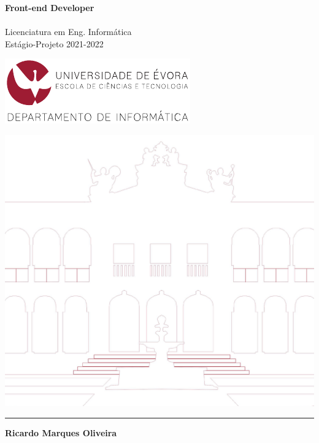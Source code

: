 \documentclass{article}
\begin{document}
\begin{titlepage}

\begin{minipage}{0.7\textwidth}
\noindent\LARGE\textbf{Front-end Developer\\\\}
\Large{Licenciatura em Eng. Informática\\}
\large{Estágio-Projeto 2021-2022\\}
\end{minipage}
\begin{minipage}[t]{0.3\textwidth}\raggedleft
\includegraphics[width=.9\linewidth]{di.pdf}
\end{minipage}
\noindent
\includegraphics[trim={0 2cm 0 0}, clip,  width=\linewidth]{claustros.png}\\

\vspace{0.5cm}
\noindent\textcolor{castanho-ue}{\rule{\textwidth}{0.03cm}}

\vspace{0.5cm}
\noindent\large\textbf{Ricardo Marques Oliveira\\}


\end{titlepage}
\end{document}
